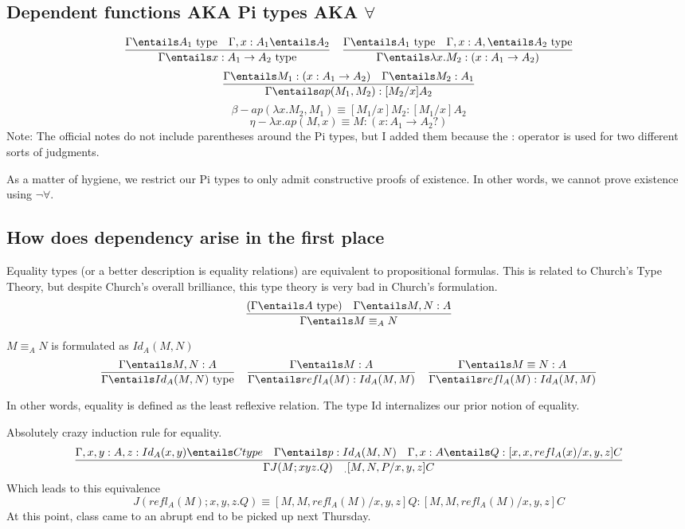 \documentclass[11pt]{article}
\begin{document}
\subsection*{Dependent functions AKA Pi types AKA $\forall$}
$$\frac{\Gamma \entails A_1 \text{ type} \quad \Gamma, x : A_1 \entails A_2}{\Gamma \entails x : A_1 \rightarrow A_2 \text{ type}} \quad \frac{\Gamma \entails A_1 \text{ type} \quad \Gamma, x : A, \entails A_2 \text{ type}}{\Gamma \entails \lambda x . M_2 : (x : A_1 \rightarrow A_2)}$$
$$\frac{\Gamma \entails M_1 : (x : A_1 \rightarrow A_2) \quad \Gamma \entails M_2 : A_1}{\Gamma \entails ap(M_1, M_2) : [M_2 / x] A_2}$$
$$\beta - ap(\lambda x . M_2 , M_1) \equiv [M_1 / x] M_2 : [M_1 / x] A_2$$
$$\eta - \lambda x . ap (M, x) \equiv M : (x : A_1 \rightarrow A_2?)$$
Note: The official notes do not include parentheses around the Pi types, but I added them because the : operator is used for two different sorts of judgments.

As a matter of hygiene, we restrict our Pi types to only admit constructive proofs of existence. In other words, we cannot prove existence using $\neg \forall$.

\subsection*{How does dependency arise in the first place}
Equality types (or a better description is equality relations) are equivalent to propositional formulas. This is related to Church's Type Theory, but despite Church's overall brilliance, this type theory is very bad in Church's formulation.
$$\frac{(\Gamma \entails A \text{ type})  \quad \Gamma \entails M, N : A}{\Gamma \entails M \equiv _A N}$$

$M \equiv _A N$ is formulated as $Id_A(M, N)$
$$\frac{\Gamma \entails M, N : A}{\Gamma \entails Id_A (M, N) \text{ type}} \quad \frac{\Gamma \entails M : A}{\Gamma \entails refl_A (M) : Id_A(M, M)} \quad \frac{\Gamma \entails M \equiv N : A}{\Gamma \entails refl_A(M) : Id_A(M, M)}$$

In other words, equality is defined as the least reflexive relation. The type Id internalizes our prior notion of equality.

Absolutely crazy induction rule for equality.
$$\frac{\Gamma, x, y : A, z : Id_A (x, y) \entails C type \quad \Gamma \entails p : Id_A(M, N) \quad \Gamma, x : A \entails Q : [x, x, refl_A (x) / x, y, z] C}{\Gamma J(M; xyz.Q) \quad _. [M, N, P / x, y, z] C}$$
Which leads to this equivalence
$$J(refl_A(M); x, y, z.Q) \equiv [M, M, refl_A(M) / x, y, z] Q : [M, M, refl_A(M) / x, y, z] C$$
At this point, class came to an abrupt end to be picked up next Thursday.
\end{document}
